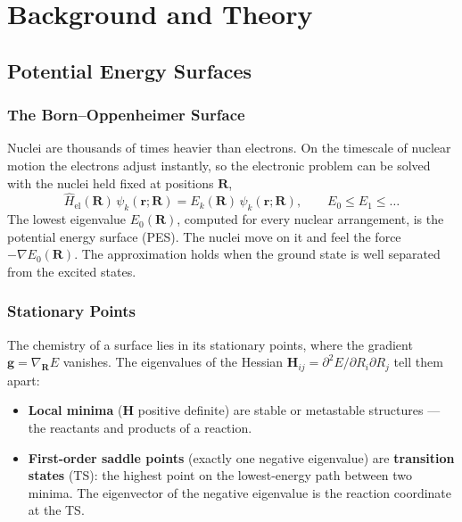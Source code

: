 
\chapter{Background and Theory}
\label{ch:background}

\section{Potential Energy Surfaces}
\label{sec:background-pes}

\subsection{The Born--Oppenheimer Surface}
\label{sec:background-bo}

Nuclei are thousands of times heavier than electrons. On the timescale of
nuclear motion the electrons adjust instantly, so the electronic problem can
be solved with the nuclei held fixed at positions $\mathbf{R}$,
%
\begin{equation}
  \hat{H}_\text{el}(\mathbf{R})\, \psi_k(\mathbf{r};\mathbf{R})
  = E_k(\mathbf{R})\, \psi_k(\mathbf{r};\mathbf{R}),
  \qquad E_0 \le E_1 \le \dots
  \label{eq:electronic-schrodinger}
\end{equation}
%
The lowest eigenvalue $E_0(\mathbf{R})$, computed for every nuclear
arrangement, is the potential energy surface (PES). The nuclei move on it and
feel the force $-\nabla E_0(\mathbf{R})$. The approximation holds when the
ground state is well separated from the excited states.

\subsection{Stationary Points}
\label{sec:background-stationary}

The chemistry of a surface lies in its stationary points, where the gradient
$\mathbf{g} = \nabla_\mathbf{R} E$ vanishes. The eigenvalues of the Hessian
$\mathbf{H}_{ij} = \partial^2 E / \partial R_i \partial R_j$ tell them apart:

\begin{itemize}
  \item \textbf{Local minima} ($\mathbf{H}$ positive definite) are stable or
    metastable structures --- the reactants and products of a reaction.
  \item \textbf{First-order saddle points} (exactly one negative eigenvalue)
    are \textbf{transition states} (TS): the highest point on the
    lowest-energy path between two minima. The eigenvector of the negative
    eigenvalue is the reaction coordinate at the TS.
\end{itemize}

